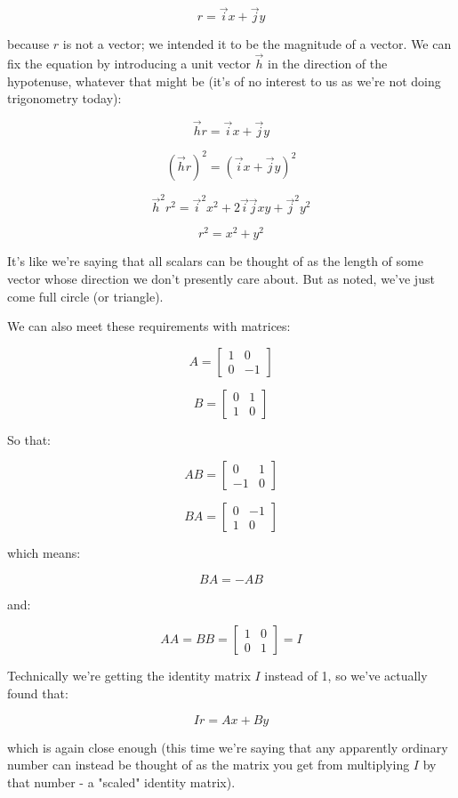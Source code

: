 $$r = \vec{i}x + \vec{j}y$$

because $r$ is not a vector; we intended it to be the magnitude of a vector. We can fix the equation by introducing a unit vector $\vec{h}$ in the direction of the hypotenuse, whatever that might be (it's of no interest to us as we're not doing trigonometry today):

$$\vec{h}r = \vec{i}x + \vec{j}y$$

$$(\vec{h}r)^2 = (\vec{i}x + \vec{j}y)^2$$

$$\vec{h}^2 r^2 = \vec{i}^2x^2 + 2\vec{i}\vec{j}xy + \vec{j}^2y^2$$

$$r^2 = x^2 + y^2$$

It's like we're saying that all scalars can be thought of as the length of some vector whose direction we don't presently care about. But as noted, we've just come full circle (or triangle).

We can also meet these requirements with matrices:

$$A = \begin{bmatrix}1 & 0 \\ 0 & -1\end{bmatrix}$$

$$B = \begin{bmatrix}0 & 1 \\ 1 & 0\end{bmatrix}$$

So that:

$$AB = \begin{bmatrix}0 & 1 \\ -1 & 0\end{bmatrix}$$

$$BA = \begin{bmatrix}0 & -1 \\ 1 & 0\end{bmatrix}$$

which means:

$$BA = -AB$$

and:

$$AA = BB = \begin{bmatrix}1 & 0 \\ 0 & 1\end{bmatrix} = I$$

Technically we're getting the identity matrix $I$ instead of 1, so we've actually found that:

$$Ir = Ax + By$$

which is again close enough (this time we're saying that any apparently ordinary number can instead be thought of as the matrix you get from multiplying $I$ by that number - a "scaled" identity matrix).

